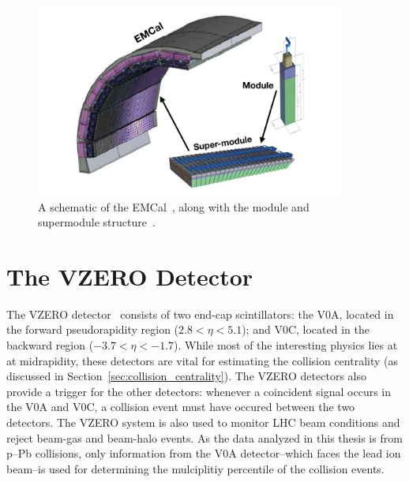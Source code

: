 \begin{figure}
    \centering
    \includegraphics[width=0.9\textwidth]{figures/experiment/emcal_schematic.png}
    \caption{A schematic of the EMCal~\cite{ERIN123}, along with the module and supermodule structure~\cite{ERIN124}.}
    \label{fig:emcal_schematic}
\end{figure}

\section{The VZERO Detector}

The VZERO detector~\cite{VZERO} consists of two end-cap scintillators: the V0A, located in the forward pseudorapidity region ($2.8 < \eta < 5.1$); and V0C, located in the backward region ($-3.7 < \eta < -1.7$). While most of the interesting physics lies at at midrapidity, these detectors are vital for estimating the collision centrality (as discussed in Section~\ref{sec:collision_centrality}). The VZERO detectors also provide a trigger for the other detectors: whenever a coincident signal occurs in the V0A and V0C, a collision event must have occured between the two detectors. The VZERO system is also used to monitor LHC beam conditions and reject beam-gas and beam-halo events. As the data analyzed in this thesis is from p--Pb collisions, only information from the V0A detector--which faces the lead ion beam--is used for determining the mulciplitiy percentile of the collision events.